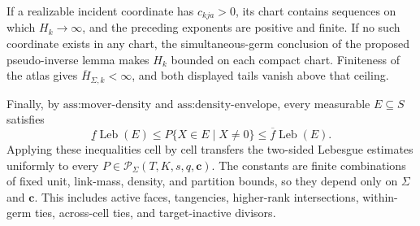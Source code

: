 If a realizable incident coordinate has \(c_{kja}>0\), its chart contains sequences on which \(H_k\to\infty\), and the preceding exponents are positive and finite. If no such coordinate exists in any chart, the simultaneous-germ conclusion of the proposed pseudo-inverse lemma makes \(H_k\) bounded on each compact chart. Finiteness of the atlas gives \(\overline H_{\Sigma,k}<\infty\), and both displayed tails vanish above that ceiling.

Finally, by \(\text{ass:mover-density}\) and \(\text{ass:density-envelope}\), every measurable \(E\subseteq S\) satisfies
\[
\underline f\operatorname{Leb}(E)
\le P\{X\in E\mid X\ne0\}
\le\overline f\operatorname{Leb}(E).
\]
Applying these inequalities cell by cell transfers the two-sided Lebesgue estimates uniformly to every \(P\in\mathcal P_\Sigma(T,K,s,q,\mathbf c)\). The constants are finite combinations of fixed unit, link-mass, density, and partition bounds, so they depend only on \(\Sigma\) and \(\mathbf c\). This includes active faces, tangencies, higher-rank intersections, within-germ ties, across-cell ties, and target-inactive divisors.